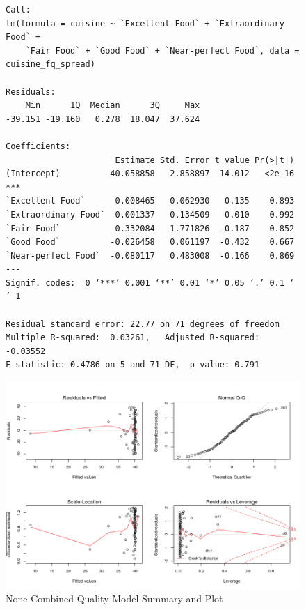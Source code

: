 \documentclass[letterpaper,10pt]{article}
\begin{document}
\begin{figure}[h]
\begin{verbatim}
Call:
lm(formula = cuisine ~ `Excellent Food` + `Extraordinary Food` + 
    `Fair Food` + `Good Food` + `Near-perfect Food`, data = cuisine_fq_spread)

Residuals:
    Min      1Q  Median      3Q     Max 
-39.151 -19.160   0.278  18.047  37.624 

Coefficients:
                      Estimate Std. Error t value Pr(>|t|)    
(Intercept)          40.058858   2.858897  14.012   <2e-16 ***
`Excellent Food`      0.008465   0.062930   0.135    0.893    
`Extraordinary Food`  0.001337   0.134509   0.010    0.992    
`Fair Food`          -0.332084   1.771826  -0.187    0.852    
`Good Food`          -0.026458   0.061197  -0.432    0.667    
`Near-perfect Food`  -0.080117   0.483008  -0.166    0.869    
---
Signif. codes:  0 ‘***’ 0.001 ‘**’ 0.01 ‘*’ 0.05 ‘.’ 0.1 ‘ ’ 1

Residual standard error: 22.77 on 71 degrees of freedom
Multiple R-squared:  0.03261,	Adjusted R-squared:  -0.03552 
F-statistic: 0.4786 on 5 and 71 DF,  p-value: 0.791
\end{verbatim}
\includegraphics[scale=.75]{../q4/cuisineQualityLMPlot.png}
\caption{None Combined Quality Model Summary and Plot}
\label{fig:tiv_lm}
\end{figure}
\end{document}
